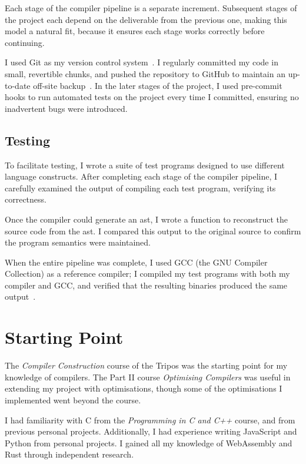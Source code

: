 \documentclass[00-main.tex]{subfiles}
\begin{document}
Each stage of the compiler pipeline is a separate increment.
Subsequent stages of the project each depend on the deliverable from the previous one, making this model a natural fit, because it ensures each stage works correctly before continuing.

I used Git as my version control system~.
I regularly committed my code in small, revertible chunks, and pushed the repository to GitHub to maintain an up-to-date off-site backup~.
In the later stages of the project, I used pre-commit hooks to run automated tests on the project every time I committed, ensuring no inadvertent bugs were introduced.

\subsection{Testing}

To facilitate testing, I wrote a suite of test programs designed to use different language constructs.
After completing each stage of the compiler pipeline, I carefully examined the output of compiling each test program, verifying its correctness.

Once the compiler could generate an \gls{ast}, I wrote a function to reconstruct the source code from the \gls{ast}.
I compared this output to the original source to confirm the program semantics were maintained.

When the entire pipeline was complete, I used GCC (the GNU Compiler Collection) as a reference compiler; I compiled my test programs with both my compiler and GCC, and verified that the resulting binaries produced the same output~.

\section{Starting Point}

The \emph{Compiler Construction} course of the Tripos was the starting point for my knowledge of compilers.
The Part II course \emph{Optimising Compilers} was useful in extending my project with optimisations, though some of the optimisations I implemented went beyond the course.

I had familiarity with C from the \emph{Programming in C and C++} course, and from previous personal projects.
Additionally, I had experience writing JavaScript and Python from personal projects.
I gained all my knowledge of WebAssembly and Rust through independent research.
\end{document}
